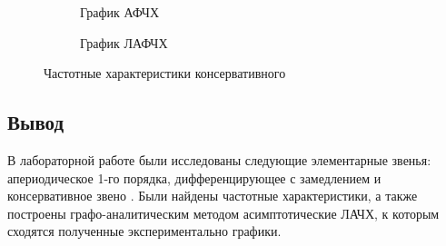 \documentclass[a4paper, 12pt]{article}
\begin{document}
\begin{figure}[h!]
    \vspace{0.5cm}

    \begin{subfigure}{0.5\textwidth}
        \centering
        \caption{График АФЧХ}
    \end{subfigure}
    \begin{subfigure}{0.5\textwidth}
        \centering
        \caption{График ЛАФЧХ}
    \end{subfigure}
    \caption{Частотные характеристики консервативного }
\end{figure}

\newpage
\begin{center}
	\section*{Вывод}
\end{center}
\par 
В лабораторной работе были исследованы следующие элементарные звенья: апериодическое 1-го порядка, дифференцирующее с замедлением и консервативное звено . Были найдены частотные характеристики, а также построены графо-аналитическим методом асимптотические ЛАЧХ, к которым сходятся полученные экспериментально графики.
\end{document}
